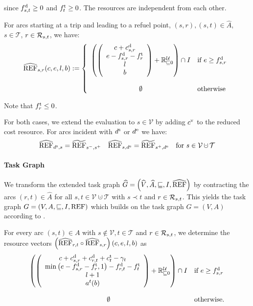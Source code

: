 since $f^{\operatorname{d}}_{s,t}\geq 0$ and $f^{\operatorname{t}}_t\geq 0$. The resources are independent from each other.

For arcs starting at a trip and leading to a refuel point, \ie ${(s,r),(s,t)\in\widehat{A}}$, ${s\in\mathcal{T}}$, ${r\in\mathcal{R}_{s,t}}$, we have:
\begin{align*}
	\widehat{\operatorname{REF}}_{s,r}(c,e,l,b) := \left\{ \begin{array}{cl}
		\left(\left( \begin{array}{c}
			c + c^{\operatorname{d}}_{s,r} \\ e - f^{\operatorname{d}}_{s,r} - f^{\operatorname{t}}_r \\ l \\ b
		\end{array} \right) + \mathbb{R}^{\mathcal{U}}_{\sqsubseteq 0}\right) \cap I & \text{if } e\geq f^{\operatorname{d}}_{s,r} \\
		\\
		\emptyset & \text{otherwise}
	\end{array} \right.
\end{align*}

Note that ${f^{\operatorname{t}}_r\leq 0}$.

For both cases, we extend the evaluation to $s\in\mathcal{V}$ by adding $c^{\operatorname{v}}$ to the reduced cost resource. For arcs incident with $d^{\operatorname{s}}$ or $d^{\operatorname{e}}$ we have:
\begin{align*}
	\widehat{\REF}_{\ds,s}=\widetilde{\REF}_{s^-,s^+} && \widehat{\REF}_{s,\de}=\widetilde{\REF}_{s^+,\de} && \text{for } s\in\mathcal{V}\cupdot\mathcal{T}
\end{align*}

\paragraph{Task Graph} \parfill

We transform the extended task graph ${\widehat{G}=\left(\widehat{V},\widehat{A},\sqsubseteq,I,\widehat{\operatorname{REF}}\right)}$ by contracting the arcs ${(r,t)\in\widehat{A}}$ for all ${s,t\in\mathcal{V}\cupdot\mathcal{T}}$ with ${s\prec t}$ and ${r\in\mathcal{R}_{s,t}}$. This yields the task graph ${G=\left(V,A,\sqsubseteq,I,\operatorname{REF}\right)}$ which builds on the task graph ${G=\left(V,A\right)}$ according to .

For every arc $(s,t)\in A$ with $s\notin\mathcal{V}, t\in\mathcal{T}$ and $r\in\mathcal{R}_{s,t}$, we determine the resource vectors ${\left(\widehat{\operatorname{REF}}_{r,t}\circ\widehat{\operatorname{REF}}_{s,r}\right)(c,e,l,b)}$ as
\begin{align*}
	\begin{array}{cl}
		\left(\left( \begin{array}{c}
			c + c^{\operatorname{d}}_{s,r} + c^{\operatorname{d}}_{r,t} + c^{\operatorname{t}}_t - \gamma_t \\ \min\left(e-f^{\operatorname{d}}_{s,r}-f^{\operatorname{t}}_r, 1\right) - f^{\operatorname{d}}_{r,t} - f^{\operatorname{t}}_t \\ l + 1 \\ a^t(b)
		\end{array} \right) + \mathbb{R}^{\mathcal{U}}_{\sqsubseteq 0} \right) \cap I & \text{if } e\geq f^{\operatorname{d}}_{s,r} \\
		\\
		\emptyset & \text{otherwise.}
	\end{array}
\end{align*}

